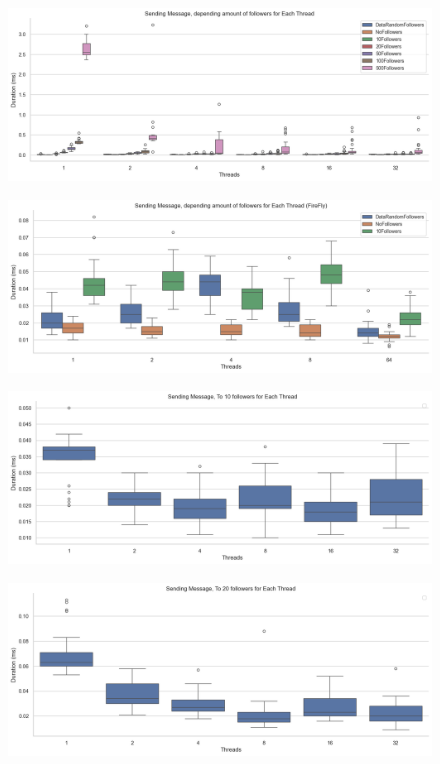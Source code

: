 \documentclass[a4paper]{article}
\begin{document}
\begin{figure}[H]
	\centering
	\includegraphics[width = \linewidth]{Images/SendingMessageLatencyBox.png}
	\caption{}
\end{figure}
\begin{figure}[H]
	\centering
	\includegraphics[width = \linewidth]{Images/SendingMessageLatencyBoxFireFly.png}
	\caption{}
\end{figure}

\begin{figure}[H]
	\centering
	\includegraphics[width = \linewidth]{Images/SendingMessageBox10Follower.png}
	\caption{}
\end{figure}

\begin{figure}[H]
	\centering
	\includegraphics[width = \linewidth]{Images/SendingMessageBox20Follower.png}
	\caption{}
\end{figure}
\end{document}
